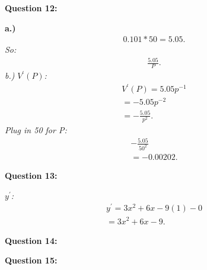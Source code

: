 \documentclass{report}
\begin{document}
    \bigbreak \noindent \bigbreak \noindent 
    \begin{Large}
        \noindent \textbf{Question 12:}
    \end{Large}
    \bigbreak \noindent 
    \bigbreak \noindent 
    \textbf{a.)}
    \begin{align*}
      0.101 * 50 = 5.05
    .\end{align*}
    \bigbreak \noindent 
    \textit{So:}
    \begin{align*}
      \frac{5.05}{P}
    .\end{align*}
    \bigbreak \noindent 
    \textit{b.)}
    \bigbreak \noindent 
    \textit{$V ^{\prime}(P)$:}
    \begin{align*}
      V ^{\prime}(P) = 5.05p^{-1} \\
      = -5.05p^{-2} \\ 
      = - \frac{5.05}{p^2}
    .\end{align*}
    \textit{Plug in 50 for P:}
    \begin{align*}
      - \frac{5.05}{50^2} \\ 
      = -0.00202
    .\end{align*}

    \bigbreak \noindent \bigbreak \noindent 
    \begin{Large}
        \noindent \textbf{Question 13:}
    \end{Large}
    \bigbreak \noindent 
    \bigbreak \noindent 
    \textit{$y ^{\prime}$:}
    \begin{align*}
      y ^{\prime} = 3x^2+6x-9(1)-0 \\
      = 3x^2+6x-9
    .\end{align*}


    \bigbreak \noindent \bigbreak \noindent 
    \begin{Large}
        \noindent \textbf{Question 14:}
    \end{Large}
    \bigbreak \noindent 
    \bigbreak \noindent 

    \bigbreak \noindent \bigbreak \noindent 
    \begin{Large}
        \noindent \textbf{Question 15:}
    \end{Large}
    \bigbreak \noindent 
    \bigbreak \noindent 
\end{document}
